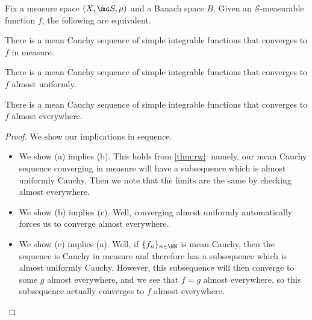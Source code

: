 \documentclass[../notes.tex]{subfiles}
\begin{document}
\begin{theorem}
	Fix a measure space $(X,\mc S,\mu)$ and a Banach space $B$. Given an $\mathcal S$-measurable function $f$, the following are equivalent.
	\begin{listalph}
		\item There is a mean Cauchy sequence of simple integrable functions that converges to $f$ in measure.
		\item There is a mean Cauchy sequence of simple integrable functions that converges to $f$ almost uniformly.
		\item There is a mean Cauchy sequence of simple integrable functions that converges to $f$ almost everywhere.
	\end{listalph}
\end{theorem}
\begin{proof}
	We show our implications in sequence.
	\begin{itemize}
		\item We show (a) implies (b). This holds from \autoref{thm:rw}: namely, our mean Cauchy sequence converging in measure will have a subsequence which is almost uniformly Cauchy. Then we note that the limits are the same by checking almost everywhere.
		\item We show (b) implies (c). Well, converging almost uniformly automatically forces us to converge almost everywhere.
		\item We show (c) implies (a). Well, if $\{f_n\}_{n\in\NN}$ is mean Cauchy, then the sequence is Cauchy in measure and therefore has a subsequence which is almost uniformly Cauchy. However, this subsequence will then converge to some $g$ almost everywhere, and we see that $f=g$ almost everywhere, so this subsequence actually converges to $f$ almost everywhere.
		\qedhere
	\end{itemize}
\end{proof}
\end{document}
